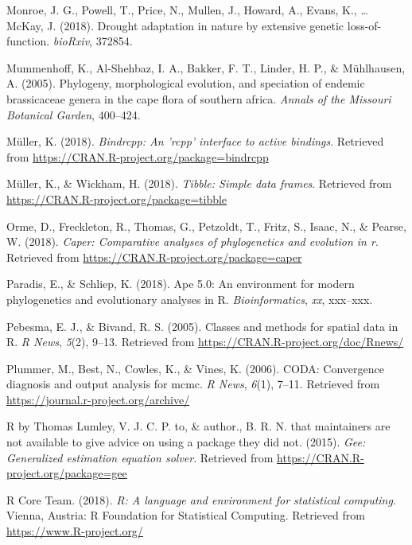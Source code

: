 \documentclass[man,floatsintext]{apa6}
\theoremstyle{definition}
\theoremstyle{definition}
\theoremstyle{definition}
\theoremstyle{remark}
\begin{document}
\leavevmode\hypertarget{ref-monroe2018drought}{}%
Monroe, J. G., Powell, T., Price, N., Mullen, J., Howard, A., Evans, K.,
\ldots{} McKay, J. (2018). Drought adaptation in nature by extensive
genetic loss-of-function. \emph{bioRxiv}, 372854.

\leavevmode\hypertarget{ref-mummenhoff2005phylogeny}{}%
Mummenhoff, K., Al-Shehbaz, I. A., Bakker, F. T., Linder, H. P., \&
Mühlhausen, A. (2005). Phylogeny, morphological evolution, and
speciation of endemic brassicaceae genera in the cape flora of southern
africa. \emph{Annals of the Missouri Botanical Garden}, 400--424.

\leavevmode\hypertarget{ref-R-bindrcpp}{}%
Müller, K. (2018). \emph{Bindrcpp: An 'rcpp' interface to active
bindings}. Retrieved from
\url{https://CRAN.R-project.org/package=bindrcpp}

\leavevmode\hypertarget{ref-R-tibble}{}%
Müller, K., \& Wickham, H. (2018). \emph{Tibble: Simple data frames}.
Retrieved from \url{https://CRAN.R-project.org/package=tibble}

\leavevmode\hypertarget{ref-R-caper}{}%
Orme, D., Freckleton, R., Thomas, G., Petzoldt, T., Fritz, S., Isaac,
N., \& Pearse, W. (2018). \emph{Caper: Comparative analyses of
phylogenetics and evolution in r}. Retrieved from
\url{https://CRAN.R-project.org/package=caper}

\leavevmode\hypertarget{ref-R-ape}{}%
Paradis, E., \& Schliep, K. (2018). Ape 5.0: An environment for modern
phylogenetics and evolutionary analyses in R. \emph{Bioinformatics},
\emph{xx}, xxx--xxx.

\leavevmode\hypertarget{ref-R-sp}{}%
Pebesma, E. J., \& Bivand, R. S. (2005). Classes and methods for spatial
data in R. \emph{R News}, \emph{5}(2), 9--13. Retrieved from
\url{https://CRAN.R-project.org/doc/Rnews/}

\leavevmode\hypertarget{ref-R-coda}{}%
Plummer, M., Best, N., Cowles, K., \& Vines, K. (2006). CODA:
Convergence diagnosis and output analysis for mcmc. \emph{R News},
\emph{6}(1), 7--11. Retrieved from
\url{https://journal.r-project.org/archive/}

\leavevmode\hypertarget{ref-R-gee}{}%
R by Thomas Lumley, V. J. C. P. to, \& author., B. R. N. that
maintainers are not available to give advice on using a package they did
not. (2015). \emph{Gee: Generalized estimation equation solver}.
Retrieved from \url{https://CRAN.R-project.org/package=gee}

\leavevmode\hypertarget{ref-R-base}{}%
R Core Team. (2018). \emph{R: A language and environment for statistical
computing}. Vienna, Austria: R Foundation for Statistical Computing.
Retrieved from \url{https://www.R-project.org/}
\end{document}
